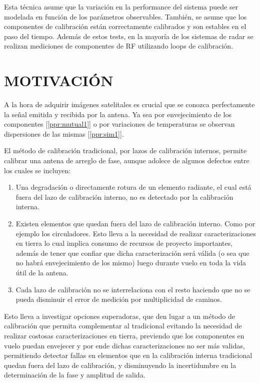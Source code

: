 \documentclass[a4paper,10pt]{article}
\begin{document}
Esta técnica asume que la variación en la performance del sistema puede ser 
modelada en función de los parámetros observables. También, se asume que los 
componentes de calibración están correctamente calibrados y son estables en el 
paso del tiempo. Además de estos tests, en la mayoría de los sistemas de radar 
se realizan mediciones de componentes de RF utilizando loops de calibración.
		
\section{MOTIVACIÓN}

A la hora de adquirir imágenes satelitales es crucial que se conozca 
perfectamente la señal emitida y recibida por la antena. Ya sea por 
envejecimiento de los componentes [\ref{ppr:mutual1}] o por variaciones de 
temperaturas se observan dispersiones de las mismas [\ref{ppr:sim1}]. 


El método de calibración tradicional, por lazos de calibración internos, permite
calibrar una antena de arreglo de fase, aunque adolece de algunos defectos entre
los cuales se incluyen:

\begin{enumerate}
    \item Una degradación o directamente rotura de un elemento radiante, el cual
está fuera del lazo de calibración interno, no es detectado por la calibración 
interna.
    \item Existen elementos que quedan fuera del lazo de calibración interno. 
Como por ejemplo los circuladores. Esto lleva a la necesidad de realizar 
caracterizaciones en tierra lo cual implica consumo de recursos de proyecto 
importantes, además de tener que confiar que dicha caracterización será válida 
(o sea que no habrá envejecimiento de los mismo) luego durante vuelo en toda la
vida útil de la antena.
    \item Cada lazo de calibración no se interrelaciona con el resto haciendo 
que no se pueda disminuir el error de medición por multiplicidad de caminos.
\end{enumerate}

Esto lleva a investigar opciones superadoras, que den lugar a un método de 
calibración que permita complementar al tradicional evitando la necesidad de 
realizar costosas caracterizaciones en tierra, previendo que los componentes en
vuelo puedan envejecer y por ende dichas caracterizaciones no ser más validas, 
permitiendo detectar fallas en elementos que en la calibración interna 
tradicional quedan fuera del lazo de calibración, y disminuyendo la 
incertidumbre en la determinación de la fase y amplitud de salida.
\end{document}
